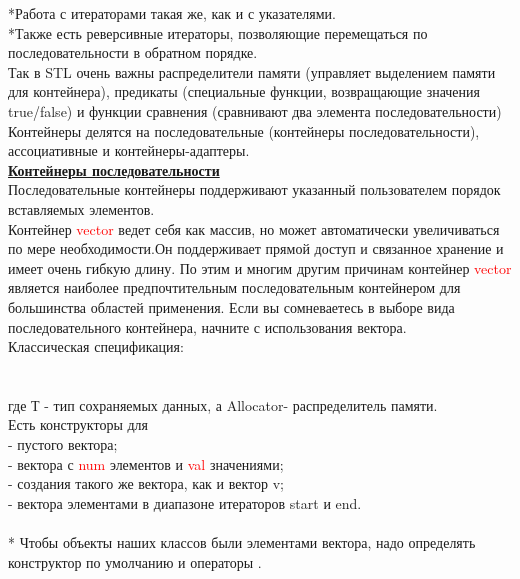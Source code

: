 \documentclass[a4paper,10pt]{article}
\begin{document}
*Работа с итераторами такая же, как и с указателями. 
\\

*Также есть реверсивные итераторы, позволяющие перемещаться по последовательности в обратном порядке.
\\

Так в STL очень важны распределители памяти (управляет выделением памяти для контейнера), предикаты (специальные функции, возвращающие значения true/false) и функции сравнения (сравнивают два элемента последовательности)
\\

Контейнеры делятся на последовательные (контейнеры последовательности), ассоциативные и контейнеры-адаптеры. 
\\

\textbf{\underline{Контейнеры последовательности}}
\\

Последовательные контейнеры поддерживают указанный пользователем порядок вставляемых элементов.
\\
 Контейнер \textcolor{red}{vector} ведет себя как массив, но может автоматически увеличиваться по мере необходимости.Он поддерживает прямой доступ и связанное хранение и имеет очень гибкую длину. По этим и многим другим причинам контейнер \textcolor{red}{vector} является наиболее предпочтительным последовательным контейнером для большинства областей применения. Если вы сомневаетесь в выборе вида последовательного контейнера, начните с использования вектора.
 \\
 
 Классическая спецификация:\\ \\
\\где Т - тип сохраняемых данных, а Allocator- распределитель памяти. 
\\

Есть конструкторы для 
\\	- пустого вектора; 
\\	- вектора с \textcolor{red}{num} элементов и \textcolor{red}{val} значениями; 
\\	- создания такого же вектора, как и вектор v; 
\\	- вектора элементами в диапазоне итераторов start и end.
\\
\\

* Чтобы объекты наших классов были элементами вектора, надо определять конструктор по умолчанию и операторы .
\\
\end{document}
